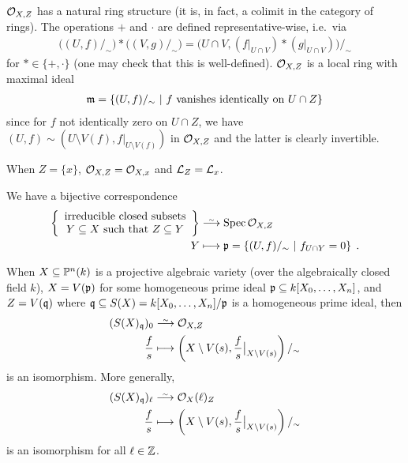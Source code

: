 \documentclass[a4paper,parskip=half,numbers=enddot, DIV=12, headheight=30pt]{scrreprt}
\begin{document}
    $\mathcal{O}_{X,Z}$ has a natural ring structure (it is, in fact, a colimit in the category of rings). The operations $+$ and $\cdot$ are defined representative-wise, i.e.\ via 
    \begin{align*}
        \big((U,f)/_\sim\big) * \big((V,g)/_\sim\big) = \big(U\cap V, (f|_{U\cap V})* (g|_{U\cap V})\big)/_\sim
    \end{align*}
    for $*\in\{+,\cdot\}$ (one may check that this is well-defined). $\mathcal{O}_{X,Z}$ is a local ring with maximal ideal
    \begin{align*}
        \mathfrak{m} = \left\{(U,f)/_\sim \ \middle|\  f\text{ vanishes identically on }U\cap Z\right\}
    \end{align*}
    since for $f$ not identically zero on $U\cap Z$, we have $(U,f)\sim\left(U\setminus V(f),f|_{U\setminus V(f)}\right)$ in $\mathcal{O}_{X,Z}$ and the latter is clearly invertible.
\begin{prop}
    \begin{alphanumerate}
    \item {}
        When $Z=\{x\}$, $\mathcal{O}_{X,Z} = \mathcal{O}_{X,x}$ and $\mathcal{L}_Z = \mathcal{L}_x$.
    \item   
	    We have a bijective correspondence
        \begin{align*}
	        \left\{
	        \begin{array}{c}
		        \text{irreducible closed subsets}\\
		        Y\subseteq X\text{ such that }Z\subseteq Y
	        \end{array}\right\}&\isomorphism\Spec \Oo_{X,Z}\\
            Y&\longmapsto \pp = \left\{(U,f)/_\sim\st f_{U\cap Y} = 0\right\}\;.
        \end{align*}
    \item 
        When $X\subseteq \mathbb{P}^n(k)$ is a projective algebraic variety (over the algebraically closed field $k$), $X=V(\mathfrak{p})$ for some homogeneous prime ideal $\mathfrak{p}\subseteq k[X_0,\ldots,X_n]$, and $Z= V(\mathfrak{q})$ where $\mathfrak{q}\subseteq S(X) = k[X_0,\ldots, X_n]/\mathfrak{p}$ is a homogeneous prime ideal, then
        \begin{align*}
            (S(X)_\qq)_0 &\isomorphism \Oo_{X,Z}\\
            \frac{f}{s} &\longmapsto \left(X\setminus V(s) , \frac{f}{s}\big|_{X\setminus V(s)}\right)/_\sim
           \end{align*}
           is an isomorphism. More generally,
           \begin{align*}
            (S(X)_\qq)_\ell &\isomorphism \Oo_X(\ell)_Z\\
            \frac{f}{s} &\longmapsto \left(X\setminus V(s) , \frac{f}{s}\big|_{X\setminus V(s)}\right)/_\sim
        \end{align*}
        is an isomorphism for all $\ell\in \mathbb{Z}$.
    \end{alphanumerate}
\end{prop}
\end{document}
